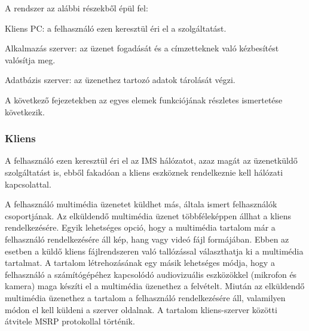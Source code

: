 \newpage

A rendszer az alábbi részekből épül fel:
\begin{mydescription}
\item[Kliens PC:] a felhasználó ezen keresztül éri el a szolgáltatást.
\item[Alkalmazás szerver:] az üzenet fogadását és a címzetteknek való kézbesítést valósítja meg.
\item[Adatbázis szerver:] az üzenethez tartozó adatok tárolását végzi.
\end{mydescription}

A következő fejezetekben az egyes elemek funkciójának részletes ismertetése következik.

\subsubsection{Kliens}
\label{sec:kliens_pc}

A felhasználó ezen keresztül éri el az IMS hálózatot, azaz magát az üzenetküldő szolgáltatást is, ebből fakadóan a kliens eszköznek rendelkeznie kell hálózati kapcsolattal.

A felhasználó multimédia üzenetet küldhet más, általa ismert felhasználók csoportjának. Az elküldendő multimédia üzenet többféleképpen állhat a kliens rendelkezésére. Egyik lehetséges opció, hogy a multimédia tartalom már a felhasználó rendelkezésére áll kép, hang vagy videó fájl formájában. Ebben az esetben a küldő kliens fájlrendszeren való tallózással választhatja ki a multimédia tartalmat. A tartalom létrehozásának egy másik lehetséges módja, hogy a felhasználó a számítógépéhez kapcsolódó audiovizuális eszközökkel (mikrofon és kamera) maga készíti el a multimédia üzenethez a felvételt. Miután az elküldendő multimédia üzenethez a tartalom a felhasználó rendelkezésére áll, valamilyen módon el kell küldeni a szerver oldalnak. A tartalom kliens-szerver közötti átvitele MSRP protokollal történik.

